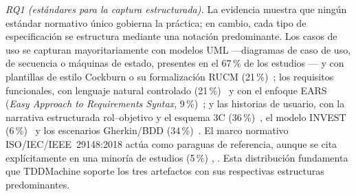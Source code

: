 \documentclass[10pt,journal,twoside,letterpaper]{IEEEtran}
\begin{document}
	\textit{RQ1 (estándares para la captura estructurada).} La evidencia muestra que ningún estándar normativo único gobierna la práctica; en cambio, cada tipo de especificación se estructura mediante una notación predominante. Los casos de uso se capturan mayoritariamente con modelos UML ---diagramas de caso de uso, de secuencia o máquinas de estado, presentes en el 67\,\% de los estudios \cite{p002,p004,p005,p006,p007,p009,p012,p014,p015,p016,p017,p018,p020,p023,p024,p025,p026,p027,p028,p029,p030,p033,p036,p039,p040,p041,p042,p044,p046,p048,p050,p052,p053,p054,p055,p056,p057,p059,p060,p062,p066,p068,p069,p071,p073,p074,p075,p076,p077,p079,p081,p082,p083,p084,p086,p088,p089,p090,p091,p092,p093,p094,p095,p096,p097,p098,p099,p101,p102,p105,p107,p108}--- y con plantillas de estilo Cockburn o su formalización RUCM (21\,\%)~\cite{p001,p017,p019,p020,p048,p050,p051,p057,p066,p070,p076,p083,p088,p089,p090,p091,p094,p095,p097,p098,p099,p105}; los requisitos funcionales, con lenguaje natural controlado (21\,\%)~\cite{p012,p014,p019,p024,p025,p026,p028,p039,p040,p041,p043,p051,p057,p060,p062,p066,p067,p073,p074,p081,p090,p097,p101} y con el enfoque EARS (\emph{Easy Approach to Requirements Syntax}, 9\,\%)~\cite{p004,p024,p025,p040,p057,p068,p071,p074,p078,p086}; y las historias de usuario, con la narrativa estructurada rol--objetivo y el esquema 3C (36\,\%)~\cite{p001,p002,p005,p007,p010,p012,p013,p014,p016,p020,p021,p024,p026,p034,p035,p041,p044,p045,p050,p055,p062,p063,p066,p067,p070,p076,p080,p081,p086,p088,p100,p101,p102,p103,p104,p105,p106,p107,p108}, el modelo INVEST (6\,\%)~\cite{p011,p018,p055,p059,p103,p108} y los escenarios Gherkin/BDD (34\,\%)~\cite{p001,p002,p004,p005,p010,p012,p013,p020,p021,p024,p033,p034,p039,p041,p042,p044,p045,p049,p050,p055,p057,p059,p061,p063,p066,p067,p073,p075,p079,p081,p082,p083,p088,p090,p091,p101}. El marco normativo ISO/IEC/IEEE~29148:2018 actúa como paraguas de referencia, aunque se cita explícitamente en una minoría de estudios (5\,\%) \cite{iso29148}, \cite{p002,p016,p070,p088,p104}. Esta distribución fundamenta que TDDMachine soporte los tres artefactos con sus respectivas estructuras predominantes.
	
\end{document}
